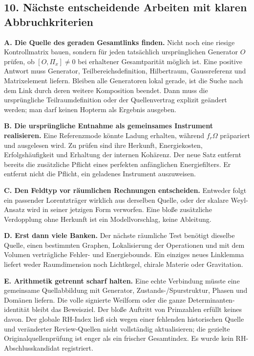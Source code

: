 \subsection{10. Nächste entscheidende Arbeiten mit klaren
Abbruchkriterien}\label{nuxe4chste-entscheidende-arbeiten-mit-klaren-abbruchkriterien}

\textbf{A. Die Quelle des geraden Gesamtlinks finden.} Nicht noch eine
riesige Kontrollmatrix bauen, sondern für jeden tatsächlich
ursprünglichen Generator \(O\) prüfen, ob \([O,\Pi_x]\ne0\) bei
erhaltener Gesamtparität möglich ist. Eine positive Antwort muss
Generator, Teilbereichsdefinition, Hilbertraum, Gaussreferenz und
Matrixelement liefern. Bleiben alle Generatoren lokal gerade, ist die
Suche nach dem Link durch deren weitere Komposition beendet. Dann muss
die ursprüngliche Teilraumdefinition oder der Quellenvertrag explizit
geändert werden; man darf keinen Hopterm als Ergebnis ausgeben.

\textbf{B. Die ursprüngliche Entnahme als gemeinsames Instrument
realisieren.} Eine Referenzmode könnte Ladung erhalten, während
\(f_r\Omega\) präpariert und ausgelesen wird. Zu prüfen sind ihre
Herkunft, Energiekosten, Erfolgshäufigkeit und Erhaltung der internen
Kohärenz. Der neue Satz entfernt bereits die zusätzliche Pflicht eines
perfekten anfänglichen Energiefilters. Er entfernt nicht die Pflicht,
ein geladenes Instrument auszuweisen.

\textbf{C. Den Feldtyp vor räumlichen Rechnungen entscheiden.} Entweder
folgt ein passender Lorentzträger wirklich aus derselben Quelle, oder
der skalare Weyl-Ansatz wird in seiner jetzigen Form verworfen. Eine
bloße zusätzliche Verdopplung ohne Herkunft ist ein Modellvorschlag,
keine Ableitung.

\textbf{D. Erst dann viele Banken.} Der nächste räumliche Test benötigt
dieselbe Quelle, einen bestimmten Graphen, Lokalisierung der Operationen
und mit dem Volumen verträgliche Fehler- und Energiebounds. Ein einziges
neues Linklemma liefert weder Raumdimension noch Lichtkegel, chirale
Materie oder Gravitation.

\textbf{E. Arithmetik getrennt scharf halten.} Eine echte Verbindung
müsste eine gemeinsame Quellabbildung mit Generator,
Zustands-/Spurstruktur, Phasen und Domänen liefern. Die volle signierte
Weilform oder die ganze Determinanten- identität bleibt das Beweisziel.
Der bloße Auftritt von Primzahlen erfüllt keines davon. Der globale
RH-Index ließ sich wegen einer fehlenden historischen Quelle und
veränderter Review-Quellen nicht vollständig aktualisieren; die gezielte
Originalquellenprüfung ist enger als ein frischer Gesamtindex. Es wurde
kein RH-Abschlusskandidat registriert.

